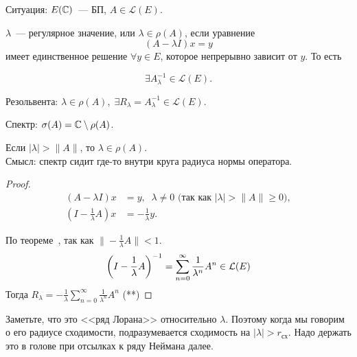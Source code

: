 Ситуация: $E(\mathbb{C})$~--- БП, $A \in \mathcal{L}(E)$.

\begin{definition}
$\lambda$~--- регулярное значение, или $\lambda \in \rho(A)$, если уравнение
\begin{equation}
    \label{equation_regular_val}
    (A - \lambda I) x = y
\end{equation}
имеет единственное решение $\forall y \in E$, которое непрерывно зависит от $y$. То есть

$$
\exists A_\lambda^{-1} \in \mathcal{L}(E).
$$

\end{definition}

\begin{definition}
    Резольвента: $\lambda \in \rho(A), \; \exists R_\lambda = A_\lambda^{-1} \in \mathcal{L}(E)$.
\end{definition}

\begin{definition}
    Спектр: $\sigma(A) = \mathbb{C} \setminus \rho(A)$.
\end{definition}

\begin{statement}[$-1$]\label{resolvent_statement_1}
    Если $|\lambda|>\|A\|$, то $\lambda \in \rho(A)$. \\
    Смысл: спектр сидит где-то внутри круга радиуса нормы оператора.
\end{statement}

\begin{proof}
    \begin{align*}
        (A-\lambda I)x &= y,\;\; \lambda \neq 0 \text{ (так как $|\lambda| > \|A\| \geq 0$)},\\
        \left(I - \frac{1}{\lambda}A\right)x &= -\frac{1}{\lambda} y.
    \end{align*}

    По теореме~, так как $\|-\frac{1}{\lambda}A\| < 1$.
    \[ \left(I-\frac{1}{\lambda}A\right)^{-1}=\sum_{n=0}^\infty \frac{1}{\lambda^n}A^n \in \mathcal{L}(E)\]
    Тогда $R_\lambda = -\frac{1}{\lambda} \sum_{n=0}^\infty \frac{1}{\lambda^n} A^n$ \hypertarget{thm10.1-neihman}{(**)}
\end{proof}

\begin{note}
    Заметьте, что это <<ряд Лорана>> относительно $\lambda$. Поэтому когда мы говорим о его радиусе сходимости, подразумевается сходимость на $|\lambda| > r_{\textit{сх}}$. Надо держать это в голове при отсылках к ряду Неймана далее. 
\end{note}

